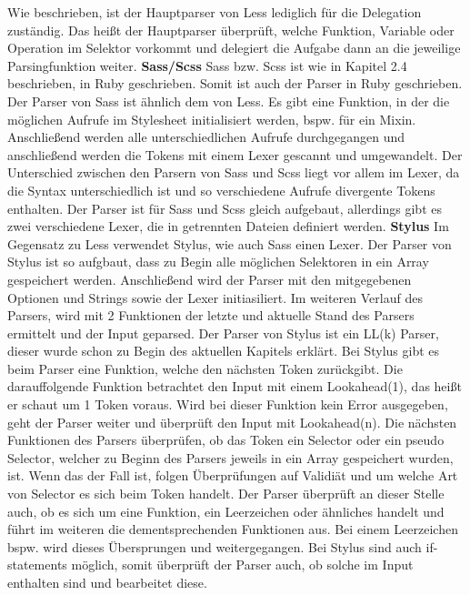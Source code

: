 Wie beschrieben, ist der Hauptparser von Less lediglich für die Delegation zuständig. Das heißt der Hauptparser überprüft, welche Funktion, Variable oder Operation im Selektor vorkommt und delegiert die Aufgabe dann an die jeweilige Parsingfunktion weiter.
\newline\newline
\textbf{Sass/Scss}\newline
Sass bzw. Scss ist wie in Kapitel 2.4 beschrieben, in Ruby geschrieben. Somit ist auch der Parser in Ruby geschrieben.\newline
Der Parser von Sass ist ähnlich dem von Less. Es gibt eine Funktion, in der die möglichen Aufrufe im Stylesheet initialisiert werden, bspw. für ein Mixin. Anschließend werden alle unterschiedlichen Aufrufe durchgegangen und anschließend werden die Tokens mit einem Lexer gescannt und umgewandelt.
Der Unterschied zwischen den Parsern von Sass und Scss liegt vor allem im Lexer, da die Syntax unterschiedlich ist und so verschiedene Aufrufe divergente Tokens enthalten. \newline
Der Parser ist für Sass und Scss gleich aufgebaut, allerdings gibt es zwei verschiedene Lexer, die in getrennten Dateien definiert werden.
\newline\newline
\textbf{Stylus}\newline
Im Gegensatz zu Less verwendet Stylus, wie auch Sass einen Lexer. Der Parser von Stylus ist so aufgbaut, dass zu Begin alle möglichen Selektoren in ein Array gespeichert werden. Anschließend wird der Parser mit den mitgegebenen Optionen und Strings sowie der Lexer initiasiliert.\newline
Im weiteren Verlauf des Parsers, wird mit 2 Funktionen der letzte und aktuelle Stand des Parsers ermittelt und der Input geparsed.\newline
Der Parser von Stylus ist ein LL(k) Parser, dieser wurde schon zu Begin des aktuellen Kapitels erklärt. Bei Stylus gibt es beim Parser eine Funktion, welche den nächsten Token zurückgibt. Die darauffolgende Funktion betrachtet den Input mit einem Lookahead(1), das heißt er schaut um 1 Token voraus. Wird bei dieser Funktion kein Error ausgegeben, geht der Parser weiter und überprüft den Input mit Lookahead(n). \newline
Die nächsten Funktionen des Parsers überprüfen, ob das Token ein Selector oder ein pseudo Selector, welcher zu Beginn des Parsers jeweils in ein Array gespeichert wurden, ist. Wenn das der Fall ist, folgen Überprüfungen auf Validiät und um welche Art von Selector es sich beim Token handelt. Der Parser überprüft an dieser Stelle auch, ob es sich um eine Funktion, ein Leerzeichen oder ähnliches handelt und führt im weiteren die dementsprechenden Funktionen aus. Bei einem Leerzeichen bspw. wird dieses Übersprungen und weitergegangen.\newline
Bei Stylus sind auch if-statements möglich, somit überprüft der Parser auch, ob solche im Input enthalten sind und bearbeitet diese.
\newpage


